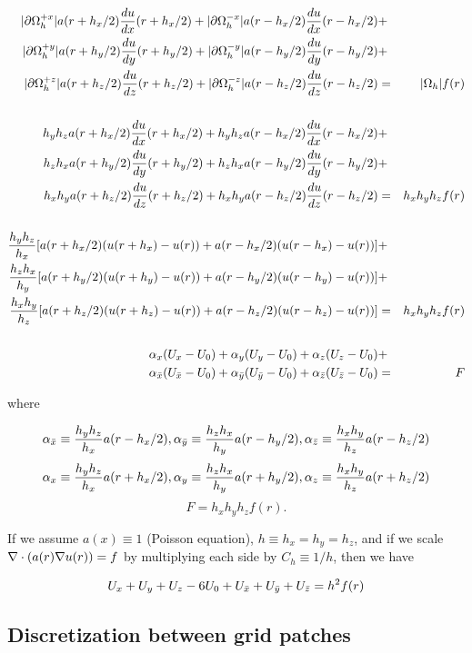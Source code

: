 \documentclass[10pt]{article}
\begin{document}
 \begin{eqnarray*}
 |\partial\Omega_h^{+x}| a(r+h_x/2) \frac{du}{dx}(r+h_x/2) + 
 |\partial\Omega_h^{-x}| a(r-h_x/2) \frac{du}{dx}(r-h_x/2) & + & \\ 
 |\partial\Omega_h^{+y}| a(r+h_y/2) \frac{du}{dy}(r+h_y/2) +
 |\partial\Omega_h^{-y}| a(r-h_y/2) \frac{du}{dy}(r-h_y/2) & + & \\ 
 |\partial\Omega_h^{+z}| a(r+h_z/2) \frac{du}{dz}(r+h_z/2) + 
 |\partial\Omega_h^{-z}| a(r-h_z/2) \frac{du}{dz}(r-h_z/2) & = & |{\Omega_h}| f(r)  \\
\\
 h_y h_z a(r+h_x/2) \frac{du}{dx}(r+h_x/2) + 
 h_y h_z a(r-h_x/2) \frac{du}{dx}(r-h_x/2) & + & \\ 
 h_z h_x a(r+h_y/2) \frac{du}{dy}(r+h_y/2) +
 h_z h_x a(r-h_y/2) \frac{du}{dy}(r-h_y/2) & + & \\ 
 h_x h_y a(r+h_z/2) \frac{du}{dz}(r+h_z/2) + 
 h_x h_y a(r-h_z/2) \frac{du}{dz}(r-h_z/2) & = & h_xh_yh_z f(r)  \\
\\
 \frac{h_y h_z}{h_x} [a(r+h_x/2) (u(r+h_x) - u(r))  + 
                      a(r-h_x/2) (u(r-h_x) - u(r))] & + & \\ 
 \frac{h_z h_x}{h_y} [a(r+h_y/2) (u(r+h_y) - u(r))  + 
                      a(r-h_y/2) (u(r-h_y) - u(r))] & + & \\ 
 \frac{h_x h_y}{h_z} [a(r+h_z/2) (u(r+h_z) - u(r))  + 
                      a(r-h_z/2) (u(r-h_z) - u(r))] & = &  h_xh_yh_z f(r)  \\
\\
 \alpha_{x} (U_{x} - U_{0})  + 
 \alpha_{y} (U_{y} - U_{0})  + 
 \alpha_{z} (U_{z} - U_{0}) & + & \\ 
 \alpha_{\bar{x}} (U_{\bar{x}} - U_{0})  + 
 \alpha_{\bar{y}} (U_{\bar{y}} - U_{0})  + 
 \alpha_{\bar{z}} (U_{\bar{z}} - U_{0}) & = &  F  \\
 \end{eqnarray*}

where

\[\alpha_{\bar{x}}  \equiv  \frac{h_yh_z}{h_x} a(r-h_x/2),
 \alpha_{\bar{y}}  \equiv  \frac{h_zh_x}{h_y} a(r-h_y/2), 
 \alpha_{\bar{z}}  \equiv  \frac{h_xh_y}{h_z} a(r-h_z/2) \]
 \[\alpha_{x}  \equiv  \frac{h_yh_z}{h_x} a(r+h_x/2), 
 \alpha_{y}  \equiv  \frac{h_zh_x}{h_y} a(r+h_y/2),
 \alpha_{z}  \equiv  \frac{h_xh_y}{h_z} a(r+h_z/2) \]
 \[F = h_xh_yh_z f(r). \]

If we assume $a(x)\equiv 1$ (Poisson equation), $h\equiv h_x = h_y =
h_z$, and if we scale $\nabla\cdot(a(r) \nabla u(r)) = f$ by multiplying
each side by $C_h \equiv 1/h$, then we have

\[ U_{x} + U_{y} + U_{z} - 6U_{0} + U_{\bar{x}} + U_{\bar{y}} + U_{\bar{z}} = h^2 f(r) \]

\subsection{Discretization between grid patches} \label{ss:discret-amr}
\end{document}
